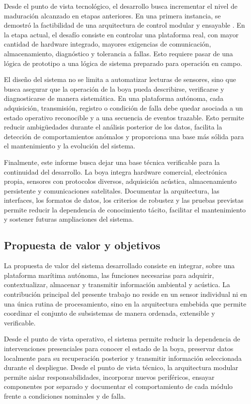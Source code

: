 Desde el punto de vista tecnológico, el desarrollo busca incrementar el nivel de maduración alcanzado en etapas anteriores. En una primera instancia, se demostró la factibilidad de una arquitectura de control modular y ensayable \citep{Bos2018MSE}. En la etapa actual, el desafío consiste en controlar una plataforma real, con mayor cantidad de hardware integrado, mayores exigencias de comunicación, almacenamiento, diagnóstico y tolerancia a fallas. Esto requiere pasar de una lógica de prototipo a una lógica de sistema preparado para operación en campo.

El diseño del sistema no se limita a automatizar lecturas de sensores, sino que busca asegurar que la operación de la boya pueda describirse, verificarse y diagnosticarse de manera sistemática. En una plataforma autónoma, cada adquisición, transmisión, registro o condición de falla debe quedar asociada a un estado operativo reconocible y a una secuencia de eventos trazable. Esto permite reducir ambigüedades durante el análisis posterior de los datos, facilita la detección de comportamientos anómalos y proporciona una base más sólida para el mantenimiento y la evolución del sistema.

Finalmente, este informe busca dejar una base técnica verificable para la continuidad del desarrollo. La boya integra hardware comercial, electrónica propia, sensores con protocolos diversos, adquisición acústica, almacenamiento persistente y comunicaciones satelitales. Documentar la arquitectura, las interfaces, los formatos de datos, los criterios de robustez y las pruebas previstas permite reducir la dependencia de conocimiento tácito, facilitar el mantenimiento y sostener futuras ampliaciones del sistema.

\subsection{Propuesta de valor y objetivos}
\label{subsec:propuesta_valor_objetivos}

La propuesta de valor del sistema desarrollado consiste en integrar, sobre una plataforma marítima autónoma, las funciones necesarias para adquirir, contextualizar, almacenar y transmitir información ambiental y acústica. La contribución principal del presente trabajo no reside en un sensor individual ni en una única rutina de procesamiento, sino en la arquitectura embebida que permite coordinar el conjunto de subsistemas de manera ordenada, extensible y verificable.

Desde el punto de vista operativo, el sistema permite reducir la dependencia de intervenciones presenciales para conocer el estado de la boya, preservar datos localmente para su recuperación posterior y transmitir información seleccionada durante el despliegue. Desde el punto de vista técnico, la arquitectura modular permite aislar responsabilidades, incorporar nuevos periféricos, ensayar componentes por separado y documentar el comportamiento de cada módulo frente a condiciones nominales y de falla.

